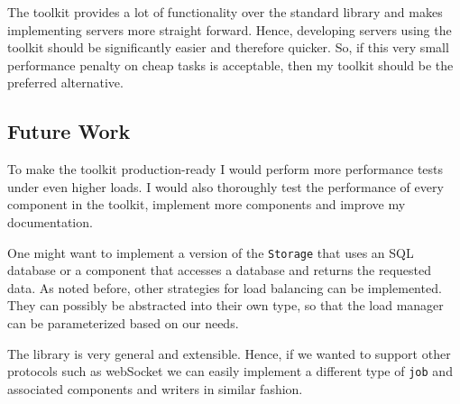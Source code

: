 The toolkit provides a lot of functionality over the
standard library and makes implementing servers more straight forward. 
Hence, developing servers using the toolkit should be
significantly easier and therefore quicker. So, if this very small performance
penalty on cheap tasks is acceptable, then my toolkit should be the preferred 
alternative.

\subsection{Future Work}
To make the toolkit production-ready I would perform  more performance 
tests under even higher loads. I would also thoroughly test the performance of
every component in the toolkit, implement more components and improve my documentation. 

One might want to implement a version of the \texttt{Storage}
that uses an SQL database or a component that accesses a database and 
returns the requested data. As noted before, other strategies 
for load balancing can be implemented. 
They can possibly be abstracted into their own type, so that the
load manager can be parameterized based on our needs.

The library is very general and extensible. Hence, if we wanted to support 
other protocols such as webSocket we can easily implement a different 
type of \texttt{job} and associated components and writers in similar fashion.


